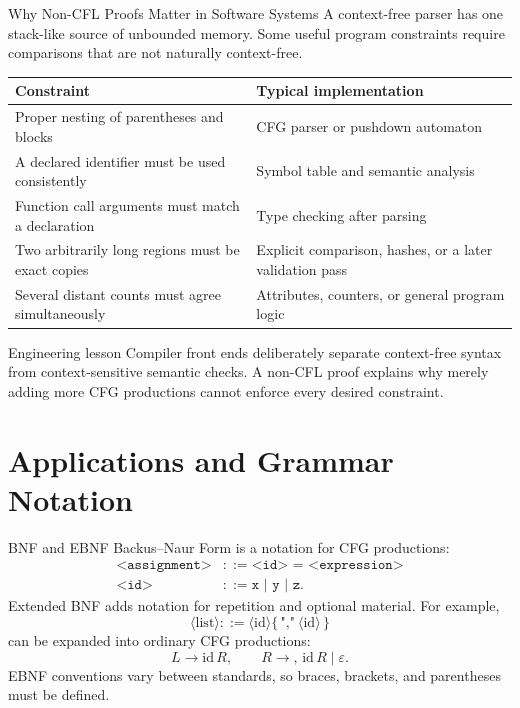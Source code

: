 \documentclass[10pt]{beamer}
\begin{document}
\begin{frame}{Why Non-CFL Proofs Matter in Software Systems}
  \small
  A context-free parser has one stack-like source of unbounded memory. Some
  useful program constraints require comparisons that are not naturally
  context-free.
  \begin{center}
  \begin{tabular}{L{4.2cm}L{6.0cm}}
    \toprule
    Constraint & Typical implementation \\
    \midrule
    Proper nesting of parentheses and blocks & CFG parser or pushdown
      automaton \\
    A declared identifier must be used consistently & Symbol table and
      semantic analysis \\
    Function call arguments must match a declaration & Type checking after
      parsing \\
    Two arbitrarily long regions must be exact copies & Explicit comparison,
      hashes, or a later validation pass \\
    Several distant counts must agree simultaneously & Attributes, counters,
      or general program logic \\
    \bottomrule
  \end{tabular}
  \end{center}
  \begin{block}{Engineering lesson}
    Compiler front ends deliberately separate context-free syntax from
    context-sensitive semantic checks. A non-CFL proof explains why merely
    adding more CFG productions cannot enforce every desired constraint.
  \end{block}
\end{frame}

\section{Applications and Grammar Notation}

\begin{frame}{BNF and EBNF}
  Backus--Naur Form is a notation for CFG productions:
  \begin{align*}
    \texttt{<assignment>} &\mathrel{::=} \texttt{<id> = <expression>}\\
    \texttt{<id>} &\mathrel{::=} \texttt{x | y | z}.
  \end{align*}
  \pause
  Extended BNF adds notation for repetition and optional material. For example,
  \[
    \langle\mathrm{list}\rangle ::= \langle\mathrm{id}\rangle
      \{\,\texttt{","}\ \langle\mathrm{id}\rangle\,\}
  \]
  can be expanded into ordinary CFG productions:
  \[
    L\to \mathrm{id}\,R,
    \qquad
    R\to ,\,\mathrm{id}\,R\mid\varepsilon.
  \]
  EBNF conventions vary between standards, so braces, brackets, and parentheses must be defined.
\end{frame}
\end{document}
